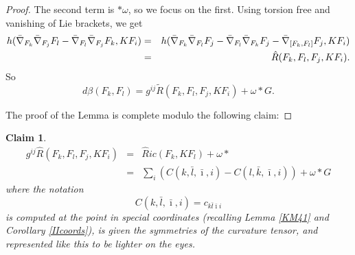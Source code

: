 \documentclass[12pt,letterpaper]{amsart}%
\newcounter{mycounter}
\numberwithin{mycounter}{section}
\theoremstyle{plain}
\newtheorem{claim}[mycounter]{Claim}
\numberwithin{equation}{section}
\theoremstyle{definition}
\begin{document}
\begin{proof}
The second term is $\ast \omega $, so we focus on the first. Using torsion
free and vanishing of Lie brackets, we get
\begin{eqnarray*}
h(\bar{\nabla}_{F_{k}}\bar{\nabla}_{F_{j}}F_{l}-\bar{\nabla}_{F_{l}}\bar{%
\nabla}_{F_{j}}F_{k},KF_{i}) &=&h(\bar{\nabla}_{F_{k}}\bar{\nabla}%
_{F_{l}}F_{j}-\bar{\nabla}_{F_{l}}\bar{\nabla}_{F_{k}}F_{j}-\bar{\nabla}%
_{[F_{k},F_{l}]}F_{j},KF_{i}) \\
&=&\hat{R}(F_{k},F_{l},F_{j},KF_{i}) .
\end{eqnarray*}%
So
\[
d\beta (F_{k},F_{l})=g^{ij}\tilde{R}(F_{k},F_{l},F_{j},KF_{i})+ \omega *G.
\]

The proof of the Lemma is complete modulo the following claim: 
\end{proof}

\begin{claim}
\begin{eqnarray*}
g^{ij}\hat{R}(F_{k},F_{l},F_{j},KF_{i}) &=&\hat{R}ic(F_{k},KF_{l})+%
\omega \ast  \\
&=&\sum_{i}\left( C(k,\bar{l},\bar{\imath},i)-C(l,\bar{k},\bar{\imath}%
,i)\right) +\omega \ast  G
\end{eqnarray*}%
where the notation
\begin{equation*}
C(k,\bar{l},\bar{\imath},i)=c_{k\bar{l}\bar{\imath}i}
\end{equation*}%
is computed at the point in special coordinates (recalling Lemma \ref{KM41} and Corollary \ref{IIcoords}), is given the symmetries of the curvature tensor, and represented like this to be lighter on the
eyes. \
\end{claim}
\end{document}
